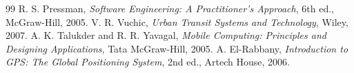 \begin{thebibliography}{99}
 R. S. Pressman, \textit{Software Engineering: A Practitioner's Approach}, 6th ed., McGraw-Hill, 2005.
 V. R. Vuchic, \textit{Urban Transit Systems and Technology}, Wiley, 2007.
 A. K. Talukder and R. R. Yavagal, \textit{Mobile Computing: Principles and Designing Applications}, Tata McGraw-Hill, 2005.
 A. El-Rabbany, \textit{Introduction to GPS: The Global Positioning System}, 2nd ed., Artech House, 2006.

\end{thebibliography}
